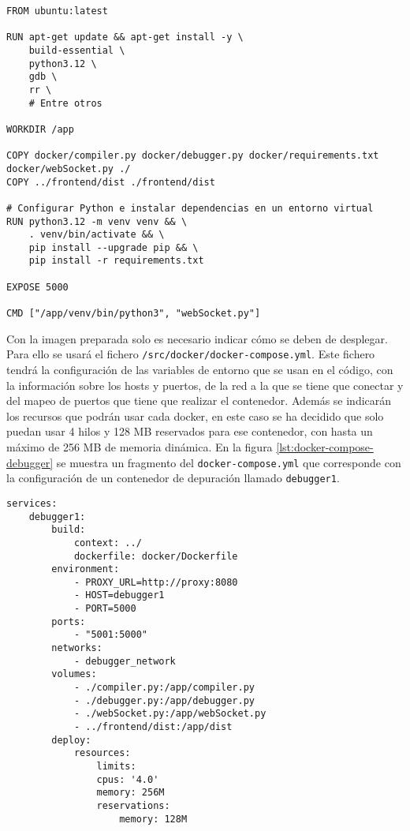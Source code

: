 \begin{lstlisting}[caption={Dockerfile para el contenedor de depuración}, label={lst:dockerfile-debugger}]
FROM ubuntu:latest

RUN apt-get update && apt-get install -y \
    build-essential \
    python3.12 \
    gdb \
    rr \
    # Entre otros

WORKDIR /app

COPY docker/compiler.py docker/debugger.py docker/requirements.txt docker/webSocket.py ./
COPY ../frontend/dist ./frontend/dist

# Configurar Python e instalar dependencias en un entorno virtual
RUN python3.12 -m venv venv && \
    . venv/bin/activate && \
    pip install --upgrade pip && \
    pip install -r requirements.txt

EXPOSE 5000

CMD ["/app/venv/bin/python3", "webSocket.py"]
\end{lstlisting}


Con la imagen preparada solo es necesario indicar cómo se deben de desplegar. Para ello se usará el fichero \texttt{/src/docker/docker-compose.yml}. Este fichero tendrá la configuración de las \gls{variables de entorno} que se usan en el código, con la información sobre los hosts y puertos, de la red a la que se tiene que conectar y del mapeo de puertos que tiene que realizar el \gls{contenedor}. Además se indicarán los recursos que podrán usar cada docker, en este caso se ha decidido que solo puedan usar 4 \glspl{hilo} y 128 MB reservados para ese \gls{contenedor}, con hasta un máximo de 256 MB de memoria dinámica. En la figura \ref{lst:docker-compose-debugger} se muestra un fragmento del \texttt{docker-compose.yml} que corresponde con la configuración de un \gls{contenedor} de depuración llamado \texttt{debugger1}.

\begin{lstlisting}[caption={Docker-compose.yml para un contenedor de depuración}, label={lst:docker-compose-debugger}]
services:
    debugger1:
        build:
            context: ../ 
            dockerfile: docker/Dockerfile
        environment:
            - PROXY_URL=http://proxy:8080 
            - HOST=debugger1
            - PORT=5000
        ports:
            - "5001:5000"
        networks:
            - debugger_network
        volumes:
            - ./compiler.py:/app/compiler.py
            - ./debugger.py:/app/debugger.py
            - ./webSocket.py:/app/webSocket.py
            - ../frontend/dist:/app/dist  
        deploy:
            resources:
                limits:
                cpus: '4.0'
                memory: 256M
                reservations:
                    memory: 128M
\end{lstlisting}

